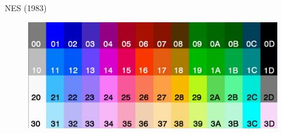 \documentclass{beamer}
\begin{document}
\begin{darkframes}
\begin{frame}{NES (1983)}
\begin{multicols}{2}
\begin{figure}[h!]
            \end{figure}
            \begin{figure}[h!]
                \centering
                \includegraphics[height=.2\textheight]{nes_palette}
            \end{figure}
        \end{multicols}
    \end{frame}


\end{darkframes}
\end{document}
